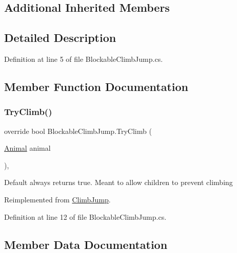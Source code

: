 \subsection*{Additional Inherited Members}


\subsection{Detailed Description}


Definition at line 5 of file Blockable\+Climb\+Jump.\+cs.



\subsection{Member Function Documentation}
\mbox{\label{class_blockable_climb_jump_a58cf472a84d9fb9f01800f75b56fd197}} 
\subsubsection{\texorpdfstring{Try\+Climb()}{TryClimb()}}
{\footnotesize\ttfamily override bool Blockable\+Climb\+Jump.\+Try\+Climb (\begin{DoxyParamCaption}\item[{\mbox{\hyperlink{class_animal}{Animal}}}]{animal }\end{DoxyParamCaption})\hspace{0.3cm}{\ttfamily [protected]}, {\ttfamily [virtual]}}



Default always returns true. Meant to allow children to prevent climbing 



Reimplemented from \mbox{\hyperlink{class_climb_jump_aa112e141ea3e2ddb0325f65e4171fdac}{Climb\+Jump}}.



Definition at line 12 of file Blockable\+Climb\+Jump.\+cs.



\subsection{Member Data Documentation}
\mbox{\label{class_blockable_climb_jump_a858c667d461fc69cdbe6fa09fa4bda81}} 
